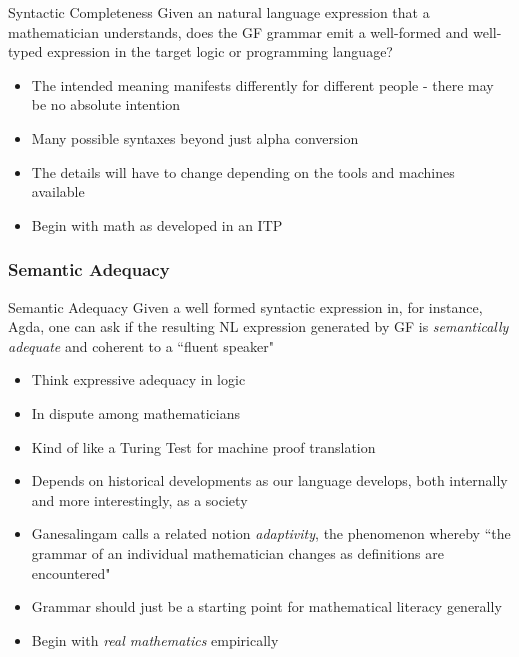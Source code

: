\documentclass[9pt]{beamer}
\begin{document}
\begin{frame}
  \begin{block}{Syntactic Completeness}
Given an natural language expression that a mathematician
understands, does the GF grammar emit a well-formed and well-typed
expression in the target logic or programming language?
\end{block}

\begin{itemize}

\item The intended meaning manifests differently for different people - there
  may be no absolute intention
\item Many possible syntaxes beyond just alpha conversion
\item The details will have to change depending on the tools and machines available
\item Begin with math as developed in an ITP
\end{itemize}

\end{frame}

\begin{frame}

\frametitle{Semantic Adequacy}

\begin{block}{Semantic Adequacy}
  Given a well formed syntactic expression in, for instance, Agda, one
can ask if the resulting NL expression generated by GF is
\emph{semantically adequate} and coherent to a ``fluent speaker"
\end{block}

\begin{itemize}
  \item Think expressive adequacy in logic
  \item In dispute among mathematicians
  \item Kind of like a Turing Test for machine proof translation 
  \item Depends on historical developments as our language develops, both
    internally and more interestingly, as a society
  \item Ganesalingam calls a related notion \emph{adaptivity}, the phenomenon whereby ``the
    grammar of an individual mathematician changes as definitions are encountered"
  \item Grammar should just be a starting point for mathematical literacy generally
  \item Begin with \emph{real mathematics} empirically

\end{itemize}


\end{frame}
\end{document}
